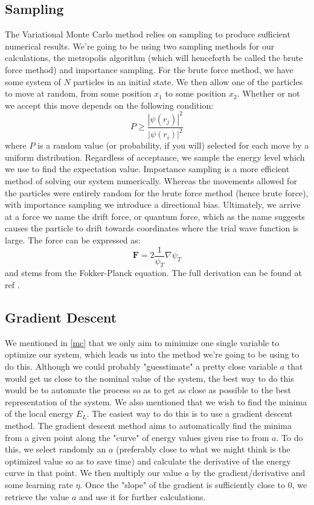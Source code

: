 \documentclass{article}
\begin{document}
\subsection{Sampling}
The Variational Monte Carlo method relies on sampling to produce sufficient numerical results. We're going to be using two sampling methods for our calculations, the metropolis algorithm (which will henceforth be called the brute force method) and importance sampling. \newline
For the brute force method, we have some system of $N$ particles in an initial state. We then allow one of the particles to move at random, from some position $x_1$ to some position $x_2$. Whether or not we accept this move depends on the following condition:
\begin{equation}
    P \geq \frac{|\psi(r_j)|^2}{|\psi(r_i)|^2}
\end{equation}
where $P$ is a random value (or probability, if you will) selected for each move by a uniform distribution. \newline
Regardless of acceptance, we sample the energy level which we use to find the expectation value. \newline
Importance sampling is a more efficient method of solving our system numerically. Whereas the movements allowed for the particles were entirely random for the brute force method (hence brute force), with importance sampling we introduce a directional bias. Ultimately, we arrive at a force we name the drift force, or quantum force, which as the name suggests causes the particle to drift towards coordinates where the trial wave function is large. The force can be expressed as:
\begin{equation}
    \mathbf{F} = 2 \frac{1}{\psi_T} \nabla \psi_T
\end{equation}
and stems from the Fokker-Planck equation. The full derivation can be found at ref \cite{week3}.
\subsection{Gradient Descent}
We mentioned in \ref{mc} that we only aim to minimize one single variable to optimize our system, which leads us into the method we're going to be using to do this. Although we could probably "guesstimate" a pretty close variable $a$ that would get us close to the nominal value of the system, the best way to do this would be to automate the process so as to get as close as possible to the best representation of the system. We also mentioned that we wish to find the minima of the local energy $E_L$. The easiest way to do this is to use a gradient descent method. \newline
The gradient descent method aims to automatically find the minima from a given point along the "curve" of energy values given rise to from $a$. To do this, we select randomly an $a$ (preferably close to what we might think is the optimized value so as to save time) and calculate the derivative of the energy curve in that point. We then multiply our value $a$ by the gradient/derivative and some learning rate $\eta$. Once the "slope" of the gradient is sufficiently close to $0$, we retrieve the value $a$ and use it for further calculations. \newpage
\end{document}
